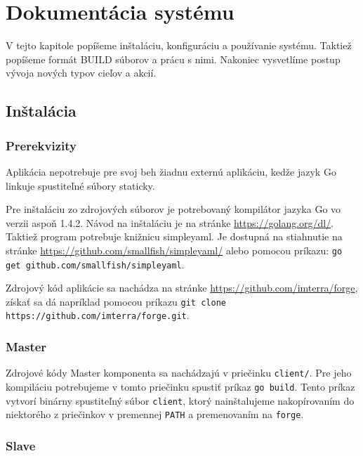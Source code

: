 \chapter{Dokument\'{a}cia syst\'{e}mu}
\label{ch:doc}

V tejto kapitole popíšeme inštaláciu, konfiguráciu a používanie systému. Taktiež
popíšeme formát BUILD súborov a prácu s nimi. Nakoniec vysvetlíme postup vývoja
nových typov cieľov a akcií.

\section{In\v{s}tal\'{a}cia}
\label{sec:installation}

\subsection{Prerekvizity}
\label{sec:installation:dependencies}

Aplikácia nepotrebuje pre svoj beh žiadnu externú aplikáciu, kedže jazyk Go linkuje
spustiteľné súbory staticky.

Pre inštaláciu zo zdrojových súborov je potrebovaný kompilátor jazyka Go vo verzii
aspoň 1.4.2. Návod na inštaláciu je na stránke \url{https://golang.org/dl/}. Taktiež
program potrebuje knižnicu simpleyaml. Je dostupná na stiahnutie na stránke
\url{https://github.com/smallfish/simpleyaml/} alebo pomocou príkazu:
\verb!go get github.com/smallfish/simpleyaml!.

Zdrojový kód aplikácie sa nachádza na stránke \url{https://github.com/imterra/forge},
získať sa dá napríklad pomocou príkazu \verb!git clone https://github.com/imterra/forge.git!.

\subsection{Master}
\label{sec:installation:master}

Zdrojové kódy Master komponenta sa nachádzajú v priečinku \texttt{client/}. Pre jeho
kompiláciu potrebujeme v tomto priečinku spustiť príkaz \verb!go build!. Tento príkaz
vytvorí binárny spustiteľný súbor \texttt{client}, ktorý nainštalujeme nakopírovaním
do niektorého z priečinkov v premennej \texttt{PATH} a premenovaním na \texttt{forge}.

\subsection{Slave}
\label{sec:installation:slave}

